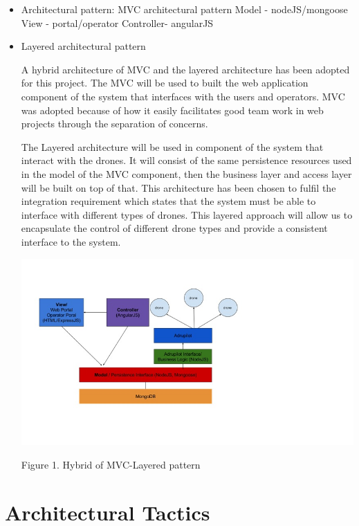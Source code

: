 \documentclass{article}
\begin{document}
	\begin{itemize}
	
	\item Architectural pattern:
	MVC architectural pattern
	Model - nodeJS/mongoose
	View - portal/operator
	Controller- angularJS
	
	\item Layered architectural pattern
	
	
	 A hybrid architecture of MVC and the layered architecture has been adopted for this project. The MVC will be used to built the web application component of the system that interfaces with the users and operators. MVC was adopted because of how it easily facilitates good team work in web projects through the separation of concerns. 
	 
	 The Layered architecture will be used in component of the system that interact with the drones. It will consist of the same persistence resources used in the model of the MVC component, then the business layer and access layer will be built on top of that. This architecture has been chosen to fulfil the integration requirement which states that the system must be able to interface with different types of drones. This layered approach will allow us to encapsulate the control of different drone types and provide a consistent interface to the system.
	
	\includegraphics{images/MVCLayered}
	
	Figure 1. Hybrid of MVC-Layered pattern
	
	\end{itemize}
	
	
	
	
	\section{Architectural Tactics}%
\end{document}
